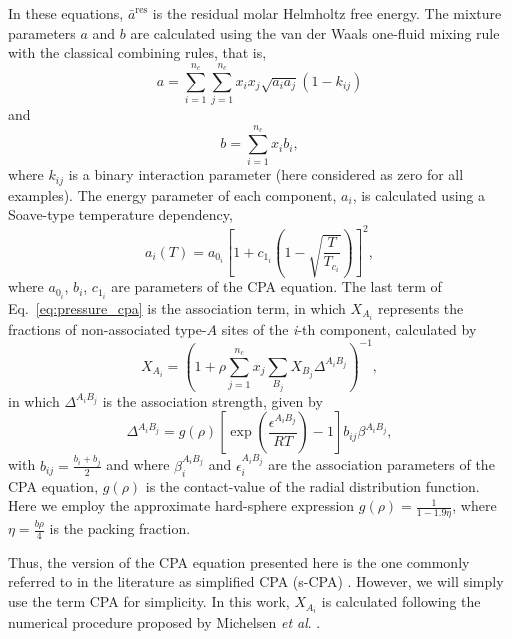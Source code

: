 \documentclass[preprint,12pt,3p]{elsarticle}
\begin{document}
In these equations, $\bar{a}^\text{res}$ is the residual molar Helmholtz free energy.
The mixture parameters $a$ and $b$ are calculated using the van der Waals one-fluid mixing rule with the classical combining rules, that is,
\begin{equation}
a = \sum_{i=1}^{n_c} \sum_{j=1}^{n_c} x_{i}x_{j}\sqrt{a_{i}a_{j}}(1-k_{ij})
\end{equation}
and
\begin{equation}
b = \sum_{i=1}^{n_c}x_{i}b_{i},
\end{equation}
where $k_{ij}$ is a binary interaction parameter (here considered as zero for all examples).
The energy parameter of each component, $a_{i}$, is calculated using a Soave-type temperature dependency,
\begin{equation}
a_{i}(T) = a_{0_{i}}\left[1+c_{1_{i}}\left(1-\sqrt{\frac{T}{T_{c_{i}}}}\right)\right]^2,
\end{equation}
where $a_{0_{i}}$, $b_{i}$, $c_{1_{i}}$ are parameters of the CPA equation.
The last term of Eq.~\ref{eq:pressure_cpa} is the association term, in which $X_{A_{i}}$ represents the fractions of non-associated type-$A$ sites of the \textit{i}-th component, calculated by
\begin{equation} \label{eq:frac_nb}
X_{A_{i}} = \left(1+\rho \sum_{j=1}^{n_c} x_{j} \sum_{B_{j}} X_{B_{j}} \Delta^{A_{i}B_{j}}\right)^{-1},
\end{equation}
in which $\Delta^{A_{i}B_{j}}$ is the association strength, given by
\begin{equation} \label{eq:delta_cpa}
\Delta^{A_{i}B_{j}} = g(\rho)\left[\exp\left(\frac{\epsilon^{A_{i}B_{j}}}{RT}\right)-1\right]b_{ij}\beta^{A_{i}B_{j}},
\end{equation}
with $b_{ij} = \frac{b_{i}+b_{j}}{2}$ and where $\beta_{i}^{A_{i}B_{j}}$ and $\epsilon_{i}^{A_{i}B_{j}}$ are the association parameters of the CPA equation, $g(\rho)$ is the contact-value of the radial distribution function. Here we employ the approximate hard-sphere expression $g(\rho) = \frac{1}{1-1.9\eta}$, where $\eta = \frac{b\rho}{4}$ is the packing fraction.

Thus, the version of the CPA equation presented here is the one commonly referred to in the literature as simplified CPA (s-CPA) \citep{kontogeorgis1999multicomponent}. However, we will simply use the term CPA for simplicity.
In this work, $X_{A_{i}}$ is calculated following the numerical procedure proposed by Michelsen \textit{et al}. \cite{michelsen2006robust}.
\end{document}
